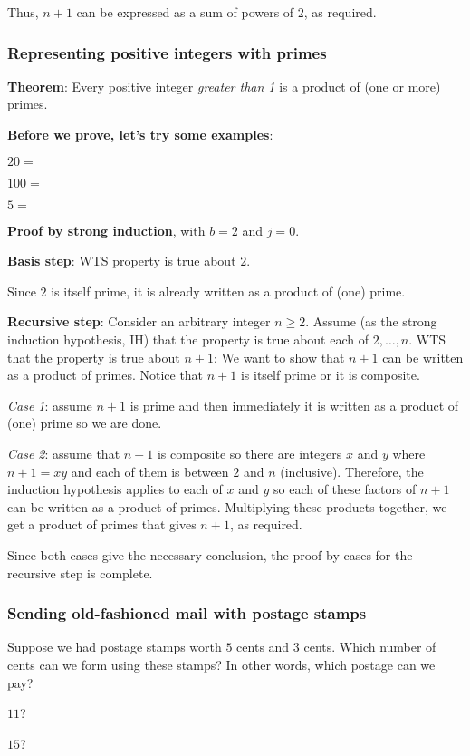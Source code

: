 \documentclass[12pt, oneside]{article}
\begin{document}
Thus, $n+1$ can be expressed as a sum of powers of $2$, as required. 
\subsubsection*{Representing positive integers with primes}


{\bf Theorem}: Every positive integer {\it greater than 1} is a product of (one or more) primes.

{\bf Before we prove, let's try some examples}:

$20 = $

$100 = $

$5 = $


{\bf Proof by strong induction}, with $b=2$ and $j=0$.

{\bf Basis step}:  WTS property is true about  $2$.

Since $2$ is itself prime,
it is already written as a product of (one) prime.


{\bf Recursive step}: Consider an arbitrary integer $n \geq 2$.
Assume (as the strong induction hypothesis, IH) that the property is true about  each of $2, \ldots, n$.  
WTS that the property is true about  $n+1$: We want to show that $n+1$ can be written 
as a product of primes.  Notice that $n+1$ is itself prime or it is composite.

{\it Case 1}: assume $n+1$ is prime and then immediately it is written as a product
of (one) prime so we are done.  

{\it Case 2}: assume that $n+1$ is composite
so there are integers $x$ and $y$ where $n+1 = xy$ and each of them is between $2$ and $n$
(inclusive).  Therefore, the induction hypothesis applies to each of $x$ and $y$ so each 
of these factors of $n+1$ can be written as a product of primes.  Multiplying these products together, 
we get a product of primes that gives $n+1$, as required. 

Since both cases give the necessary
conclusion, the proof by cases for the recursive step is complete. \subsubsection*{Sending old-fashioned mail with postage stamps}


Suppose we had postage stamps worth $5$ cents and $3$ cents.
Which number of cents can we form using these stamps?
In other words, which postage can we pay?

$11$? 

$15$? 
\end{document}
